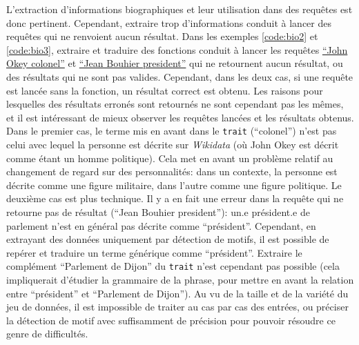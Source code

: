 \documentclass[a4paper, 12pt, twoside]{book}
\newcommand{\ttrait}{\texttt{trait}}
\newcommand{\wkd}{\textit{Wikidata}}
\begin{document}
L'extraction d'informations biographiques et leur utilisation dans des requêtes est donc pertinent. Cependant, extraire trop d'informations conduit à lancer des requêtes qui ne renvoient aucun résultat. Dans les exemples \ref{code:bio2} et \ref{code:bio3}, extraire et traduire des fonctions conduit à lancer les requêtes \href{https://www.wikidata.org/w/index.php?search=John+Okey+colonel&title=Special:Search&profile=advanced&fulltext=1&ns0=1&ns120=1}{\enquote{John Okey colonel}} et \href{https://www.wikidata.org/w/index.php?search=Jean+Bouhier+president&title=Special:Search&profile=advanced&fulltext=1&ns0=1&ns120=1}{\enquote{Jean Bouhier president}} qui ne retournent aucun résultat, ou des résultats qui ne sont pas valides. Cependant, dans les deux cas, si une requête est lancée sans la fonction, un résultat correct est obtenu. Les raisons pour lesquelles des résultats erronés sont retournés ne sont cependant pas les mêmes, et il est intéressant de mieux observer les requêtes lancées et les résultats obtenus. Dans le premier cas, le terme mis en avant dans le \ttrait{} (\enquote{colonel}) n'est pas celui avec lequel la personne est décrite sur \wkd{} (où John Okey est décrit comme étant un homme politique). Cela met en avant un problème relatif au changement de regard sur des personnalités: dans un contexte, la personne est décrite comme une figure militaire, dans l'autre comme une figure politique. Le deuxième cas est plus technique. Il y a en fait une erreur dans la requête qui ne retourne pas de résultat (\enquote{Jean Bouhier president}): un.e président.e de parlement n'est en général pas décrite comme \enquote{président}. Cependant, en extrayant des données uniquement par détection de motifs, il est possible de repérer et traduire un terme générique comme \enquote{président}. Extraire le complément \enquote{Parlement de Dijon} du \ttrait{} n'est cependant pas possible (cela impliquerait d'étudier la grammaire de la phrase, pour mettre en avant la relation entre \enquote{président} et \enquote{Parlement de Dijon}). Au vu de la taille et de la variété du jeu de données, il est impossible de traiter au cas par cas des entrées, ou préciser la détection de motif avec suffisamment de précision pour pouvoir résoudre ce genre de difficultés. 
\end{document}
